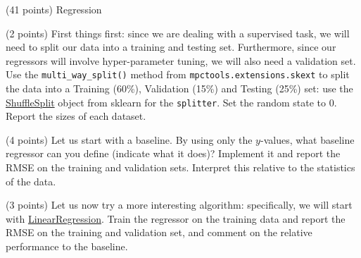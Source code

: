 \documentclass[12pt]{article}
\begin{document}
\begin{question}{\label{Q_LR_BA}(41 points) Regression}





\begin{subquestion}{(2 points) First things first: since we are dealing with a supervised task, we will need to split our data into a training and testing set. Furthermore, since our regressors will involve hyper-parameter tuning, we will also need a validation set. Use the \texttt{multi\_way\_split()} method from \texttt{mpctools.extensions.skext} to split the data into a Training (60\%), Validation (15\%) and Testing (25\%) set: use the \href{https://scikit-learn.org/stable/modules/generated/sklearn.model_selection.ShuffleSplit.html}{ShuffleSplit} object from sklearn for the \texttt{splitter}. Set the random state to 0.  Report the sizes of each dataset.}






\end{subquestion}

\begin{subquestion}{(4 points) Let us start with a baseline. By using only the $y$-values, what baseline regressor can you define (indicate what it does)? Implement it and report the RMSE on the training and validation sets. Interpret this relative to the statistics of the data.}






\end{subquestion}

\begin{subquestion}{(3 points) Let us now try a more interesting algorithm: specifically, we will start with \href{https://scikit-learn.org/stable/modules/generated/sklearn.linear_model.LinearRegression.html}{LinearRegression}. Train the regressor on the training data and report the RMSE on the training and validation set, and comment on the relative performance to the baseline.}




\end{subquestion}
\end{question}
\end{document}
